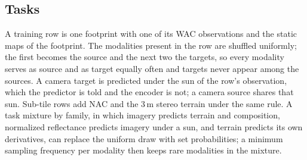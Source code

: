 \subsection{Tasks}
\label{sec:tasks}

A training row is one footprint with one of its WAC observations and the static maps of the footprint. The modalities present in the row are shuffled uniformly; the first becomes the source and the next two the targets, so every modality serves as source and as target equally often and targets never appear among the sources. A camera target is predicted under the sun of the row's observation, which the predictor is told and the encoder is not; a camera source shares that sun. Sub-tile rows add NAC and the 3\,m stereo terrain under the same rule. A task mixture by family, in which imagery predicts terrain and composition, normalized reflectance predicts imagery under a sun, and terrain predicts its own derivatives, can replace the uniform draw with set probabilities; a minimum sampling frequency per modality then keeps rare modalities in the mixture.
